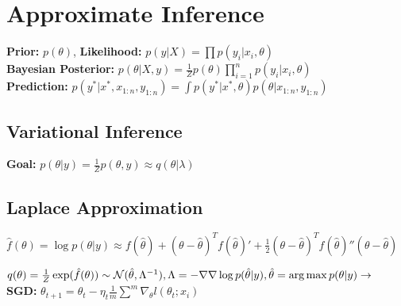 \begin{comment}
	\pagebreak
\end{comment}

\section{Approximate Inference}
\textbf{Prior:} $p(\theta)$, \textbf{Likelihood:} $p(y|X) = \prod p(y_i | x_i, \theta)$\\
\textbf{Bayesian Posterior:} $p(\theta | X,y) = \frac{1}{Z} p(\theta) \prod_{i=1}^n p(y_i | x_i, \theta)$\\
\textbf{Prediction:} $p(y^* | x^*, x_{1:n}, y_{1:n}) = \int p(y^* | x^*, \theta) p(\theta | x_{1:n}, y_{1:n})$
\begin{comment}
	We condition everything on the x's, but this notation is dropped now for ease of notation.\\
\end{comment}

\subsection{Variational Inference}
\textbf{Goal:} $p(\theta|y) = \frac{1}{Z}p(\theta,y) \approx q(\theta|\lambda)$\\

\subsection{Laplace Approximation}
$\hat{f}(\theta) = \log p(\theta | y) \approx f(\hat{\theta}) + (\theta - \hat{\theta})^T f(\hat{\theta})' + \frac{1}{2}(\theta - \hat{\theta})^T f(\hat{\theta})'' (\theta - \hat{\theta})$\\
\begin{comment}
	It is the second order taylor expansion around the posterior mode. 
	The first derivative cancels out, since it is zero at the mode.\\
\end{comment}

$q(\theta) = \frac{1}{Z} \exp(\hat{f}(\theta)) \sim \mathcal{N}(\hat{\theta}, \Lambda^{-1}), 
\Lambda = - \nabla \nabla \log p(\hat{\theta} | y), \\
\hat{\theta} = \operatorname*{arg\,max} p(\theta|y) \rightarrow$
\textbf{SGD:} $\theta_{t+1} = \theta_t - \eta_t\frac{1}{m}\sum^m\nabla_{\theta}l(\theta_t; x_i)$\\
\begin{comment}
	\textbf{Convergence:} With proper learning rate, converges to (local) minimum. Convex functions only have a global minimum.\\
\end{comment}

